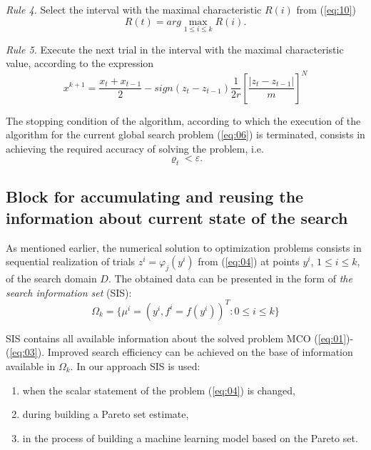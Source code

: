 \documentclass[runningheads]{llncs}
\begin{document}
\textit{Rule 4.} Select the interval with the maximal characteristic $R(i)$ from (\ref{eq:10})
\begin{equation}
    \label{eq:11}
    R(t) = arg\max_{1 \leq i \leq k} {R(i)}.
\end{equation}

\textit{Rule 5.} Execute the next trial in the interval with the maximal characteristic value, according to the expression
\begin{equation}
    \label{eq:12}
    x^{k+1} = \frac{x_t + x_{t-1}}{2} - sign(z_t - z_{t-1}) \frac{1}{2r} \left[\frac{|z_t - z_{t-1}|}{m} \right]^N
\end{equation}

The stopping condition of the algorithm, according to which the execution of the algorithm for the current global search problem (\ref{eq:06}) is terminated, consists in achieving the required accuracy of solving the problem, i.e.
\begin{equation}
    \label{eq:13}
    \varrho_t < \varepsilon.
\end{equation}



\subsection{Block for accumulating and reusing the information about current state of the search}
\label{subsec32}

As mentioned earlier, the numerical solution to optimization problems consists in sequential realization of trials $z^i=\varphi_j (y^i)$ from (\ref{eq:04}) at points $y^i$, $1 \leq i \leq k$, of the search domain $D$. The obtained data can be presented in the form of \textit{the search information set} (SIS):
\begin{equation}
    \label{eq:14}
    \Omega_k=\{\mu^i=(y^i,f^i=f(y^i))^T: 0 \leq i \leq k\}
\end{equation}

SIS contains all available information about the solved problem MCO (\ref{eq:01})-(\ref{eq:03}). Improved search efficiency can be achieved on the base of information available in $\Omega_k$. In our approach SIS is used:
\begin{enumerate}
	\item	when the scalar statement of the problem (\ref{eq:04}) is changed,
	\item	during building a Pareto set estimate, 
	\item	in the process of building a machine learning model based on the Pareto set.
\end{enumerate}
\end{document}

